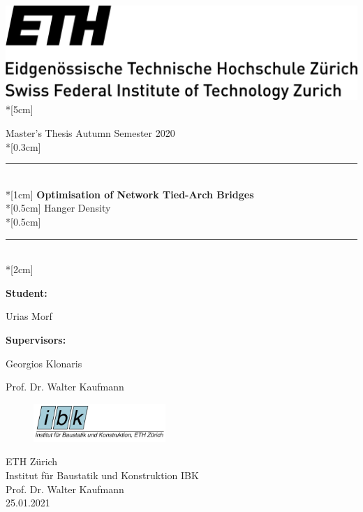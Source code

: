 \thispagestyle{empty}
\begin{flushleft}
      \includegraphics[scale=0.03]{Pictures/eth_logo_lang_pos.jpg} \\*[5cm]
\end{flushleft}

\begin{center}
    {\huge\rm Master's Thesis Autumn Semester 2020} \\*[0.3cm]
    \rule{\textwidth}{3pt}\vspace*{-\baselineskip}\vspace*{2pt}\\*[1cm] 	%
    {\huge\rm \textbf{Optimisation of Network Tied-Arch Bridges }}\\*[0.5cm]
    {\huge\rm Hanger Density}\\*[0.5cm]	
    \rule{\textwidth}{3pt}\vspace*{-\baselineskip}\vspace*{2pt}\\*[2cm] 	%
\end{center}

\textbf{Student:} 

Urias Morf
\vspace*{1cm}

\textbf{Supervisors:}

Georgios Klonaris

Prof. Dr. Walter Kaufmann

\vspace*{4.8cm}

\begin{figure}
\vspace{-5pt}
\hfill\includegraphics[width=5cm]{Pictures/IBK-Logo.jpg}
\end{figure}
    
\rm ETH Zürich\\
\rm Institut für Baustatik und Konstruktion IBK\\
\rm Prof. Dr. Walter Kaufmann\\
\rm 25.01.2021